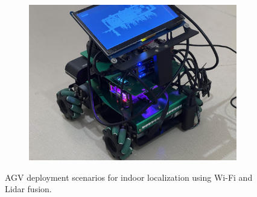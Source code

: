 \documentclass[12pt,a4paper]{article}
\numberwithin{equation}{section}
\begin{document}
\begin{figure}[H]
\begin{subfigure}[b]{0.5\textwidth}
    \end{subfigure}
    \begin{subfigure}[b]{0.5\textwidth}
        \centering
        \includegraphics[width=\textwidth]{images/test/3.jpg}
        \caption{}
    \end{subfigure}
\caption{AGV deployment scenarios for indoor localization using Wi-Fi and Lidar fusion.}
\end{figure}
\end{document}
